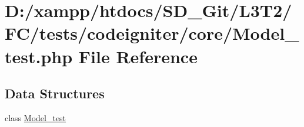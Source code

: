 \hypertarget{tests_2codeigniter_2core_2_model__test_8php}{}\section{D\+:/xampp/htdocs/\+S\+D\+\_\+\+Git/\+L3\+T2/\+F\+C/tests/codeigniter/core/\+Model\+\_\+test.php File Reference}
\label{tests_2codeigniter_2core_2_model__test_8php}
\subsection*{Data Structures}
\begin{DoxyCompactItemize}
\item 
class \hyperlink{class_model__test}{Model\+\_\+test}
\end{DoxyCompactItemize}
